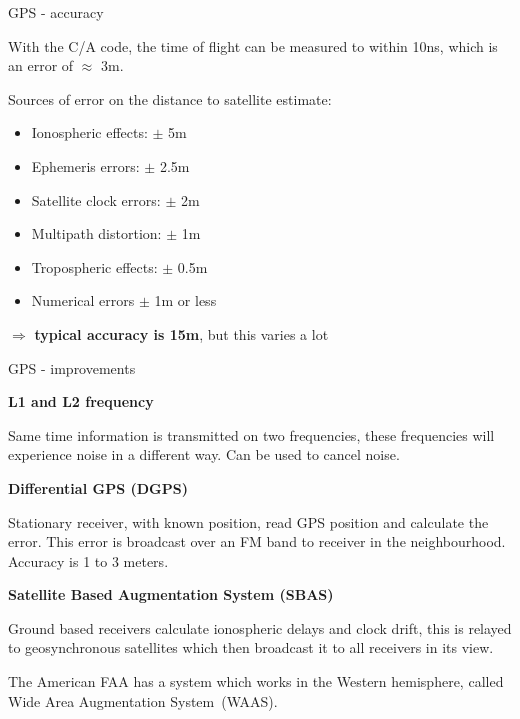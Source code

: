\documentclass[compress]{beamer}
\begin{document}
\begin{frame}{GPS - accuracy}

With the C/A code, the time of flight can be measured to within 10ns,
which is an error of $\approx$ 3m.

Sources of error on the distance to satellite estimate:

\begin{itemize}

\item Ionospheric effects: $\pm$ 5m
\item Ephemeris errors: $\pm$ 2.5m
\item Satellite clock errors: $\pm$ 2m
\item Multipath distortion: $\pm$ 1m
\item Tropospheric effects: $\pm$ 0.5m
\item Numerical errors $\pm$ 1m or less
\end{itemize}

    $\Rightarrow$ {\bf typical accuracy is 15m}, but this varies a lot

\end{frame}

\begin{frame}{GPS - improvements}

    {\bf L1 and L2 frequency}

    Same time information is transmitted on two frequencies, these
    frequencies will experience noise in a different way. Can be used to
    cancel noise.

    \pause

    {\bf Differential GPS (DGPS)}

    Stationary receiver, with known position, read GPS position and
    calculate the error. This error is broadcast over an FM band to
    receiver in the neighbourhood. Accuracy is 1 to 3 meters.

    \pause

     {\bf Satellite Based Augmentation System (SBAS)}

    Ground based receivers calculate ionospheric delays and clock drift,
    this is relayed to geosynchronous satellites which then broadcast it
    to all receivers in its view.

    The American FAA has a system which works
    in the Western hemisphere, called Wide Area Augmentation
    System~(WAAS).

\end{frame}
\end{document}
